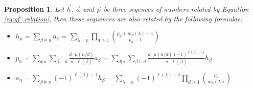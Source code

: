 \documentclass[11pt]{amsart}
\newtheorem{proposition}[theorem]{Proposition}
\theoremstyle{definition}
\numberwithin{equation}{section}
\begin{document}
\begin{proposition}
\label{prop:sequences}
    Let $\vec{h}$, $\vec{a}$ and $\vec{p}$ be three seqences of numbers related by
    Equation \eqref{eq:gf_relation}, then these sequences are also related by the following formulae:
    \begin{itemize}
        \item[i)] $\displaystyle h_n
        = \sum_{\beta \vDash n} a_\beta
        = \sum_{\lambda \vdash n} \prod_{d \geq 1} \binom{p_d + m_d(\lambda) -1}{p_d -1}$
        \item[ii)] $\displaystyle p_n
        = \sum_{d|n} \sum_{\beta \vDash d} \frac{d\cdot \mu(n/d)}{n \cdot \ell(\beta)} a_\beta
        = \sum_{d|n} \sum_{\beta \vDash d} \frac{d\cdot \mu(n/d) (-1)^{\ell(\beta)-1}}{n \cdot \ell(\beta)} h_\beta$
        \item[iii)] $\displaystyle a_n
        = \sum_{\beta \vDash n} (-1)^{\ell(\beta)-1} h_\beta
        = \sum_{\lambda \vdash n} (-1)^{\ell(\lambda)-1} \prod_{d \geq 1} \binom{p_d}{m_d(\lambda)}~$
    \end{itemize}
\end{proposition}
\end{document}
